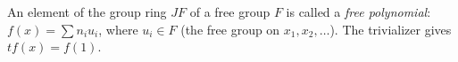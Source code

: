 An element of the group ring $JF$ of a free group $F$ is called a \textit{free polynomial}: $f(x) = \sum n_i u_i$, where $u_i \in F$ (the free group on $x_1, x_2, \ldots$). The trivializer gives $t f(x) = f(1)$.

